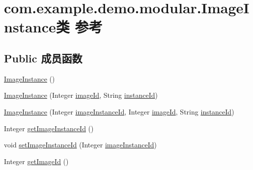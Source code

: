 \hypertarget{classcom_1_1example_1_1demo_1_1modular_1_1_image_instance}{}\section{com.\+example.\+demo.\+modular.\+Image\+Instance类 参考}
\label{classcom_1_1example_1_1demo_1_1modular_1_1_image_instance}
\subsection*{Public 成员函数}
\begin{DoxyCompactItemize}
\item 
\mbox{\hyperlink{classcom_1_1example_1_1demo_1_1modular_1_1_image_instance_a6231f70426654298eb7747a02735a5a5}{Image\+Instance}} ()
\item 
\mbox{\hyperlink{classcom_1_1example_1_1demo_1_1modular_1_1_image_instance_afb2720a2ec2bf00e0d5550997992e5eb}{Image\+Instance}} (Integer \mbox{\hyperlink{classcom_1_1example_1_1demo_1_1modular_1_1_image_instance_a0d3655213873ac2a296adc449bf0f591}{image\+Id}}, String \mbox{\hyperlink{classcom_1_1example_1_1demo_1_1modular_1_1_image_instance_aae2c9528565404c8bae6e0ee1bd78d17}{instance\+Id}})
\item 
\mbox{\hyperlink{classcom_1_1example_1_1demo_1_1modular_1_1_image_instance_ac85635d5b45f1f42043cf487600e425a}{Image\+Instance}} (Integer \mbox{\hyperlink{classcom_1_1example_1_1demo_1_1modular_1_1_image_instance_ae3299e2111cf8c5cf1757347f1cb9011}{image\+Instance\+Id}}, Integer \mbox{\hyperlink{classcom_1_1example_1_1demo_1_1modular_1_1_image_instance_a0d3655213873ac2a296adc449bf0f591}{image\+Id}}, String \mbox{\hyperlink{classcom_1_1example_1_1demo_1_1modular_1_1_image_instance_aae2c9528565404c8bae6e0ee1bd78d17}{instance\+Id}})
\item 
Integer \mbox{\hyperlink{classcom_1_1example_1_1demo_1_1modular_1_1_image_instance_a683f5cfe1a2c8fc6dcfc9951d8ff9673}{get\+Image\+Instance\+Id}} ()
\item 
void \mbox{\hyperlink{classcom_1_1example_1_1demo_1_1modular_1_1_image_instance_a900d705ff00c683ea07c2c48a1234184}{set\+Image\+Instance\+Id}} (Integer \mbox{\hyperlink{classcom_1_1example_1_1demo_1_1modular_1_1_image_instance_ae3299e2111cf8c5cf1757347f1cb9011}{image\+Instance\+Id}})
\item 
Integer \mbox{\hyperlink{classcom_1_1example_1_1demo_1_1modular_1_1_image_instance_aec99a685108fac1eab47c5b1c59e1b25}{get\+Image\+Id}} ()

\end{DoxyCompactItemize}
